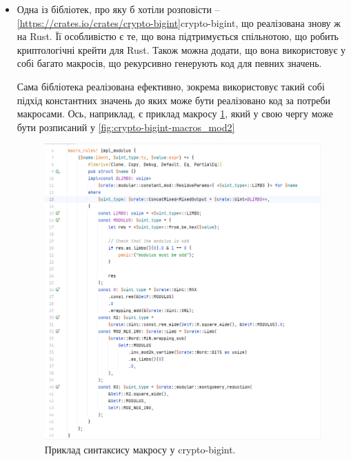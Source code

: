 \begin{itemize}

\item Одна із бібліотек, про яку б хотіли розповісти -- \ref{https://crates.io/crates/crypto-bigint}{crypto-bigint}, що реалізована знову ж на Rust. Її особливістю є те, що вона підтримується спільнотою, що робить криптологічні крейти для Rust. Також можна додати, що вона використовує у собі багато макросів, що рекурсивно генерують код для певних значень.

	Сама бібліотека реалізована ефективно, зокрема використовує такий собі підхід константних значень до яких може бути реалізовано код за потреби макросами. 
	Ось, наприклад, є приклад макросу \ref{fig:crypto-bigint-macros_mod}, який у свою чергу може бути розписаний у \ref{fig:crypto-bigint-macros_mod2} 

	\begin{figure}[h]
	    \centering
    		\includegraphics[scale = 0.25]{Images/crypto-bigint-macros_mod}
	    \caption{Приклад синтаксису макросу у crypto-bigint.}
    		\label{fig:crypto-bigint-macros_mod}
	\end{figure}


\end{itemize}
